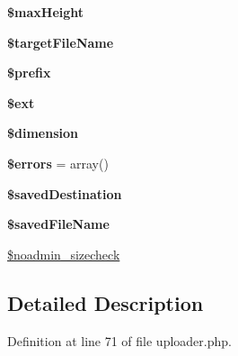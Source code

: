 \begin{DoxyCompactItemize}
\item 
\hypertarget{class_xoops_media_uploader_a51d0340c9b1667b56c371dd3b2a8e461}{{\bfseries \$max\-Height}}\label{class_xoops_media_uploader_a51d0340c9b1667b56c371dd3b2a8e461}

\item 
\hypertarget{class_xoops_media_uploader_a1d1c024dae3b732f752c751b4b34b765}{{\bfseries \$target\-File\-Name}}\label{class_xoops_media_uploader_a1d1c024dae3b732f752c751b4b34b765}

\item 
\hypertarget{class_xoops_media_uploader_a09e8cf95b9d29955a0bfabca9b420edc}{{\bfseries \$prefix}}\label{class_xoops_media_uploader_a09e8cf95b9d29955a0bfabca9b420edc}

\item 
\hypertarget{class_xoops_media_uploader_ade30ae71930839daaf6f83bd19081493}{{\bfseries \$ext}}\label{class_xoops_media_uploader_ade30ae71930839daaf6f83bd19081493}

\item 
\hypertarget{class_xoops_media_uploader_a763474b73f8036c19e7d429a99a899d6}{{\bfseries \$dimension}}\label{class_xoops_media_uploader_a763474b73f8036c19e7d429a99a899d6}

\item 
\hypertarget{class_xoops_media_uploader_ab24faf4aa647cdcee494fc48524ad4ff}{{\bfseries \$errors} = array()}\label{class_xoops_media_uploader_ab24faf4aa647cdcee494fc48524ad4ff}

\item 
\hypertarget{class_xoops_media_uploader_aef4113061d8485d20bbd51b55351b91f}{{\bfseries \$saved\-Destination}}\label{class_xoops_media_uploader_aef4113061d8485d20bbd51b55351b91f}

\item 
\hypertarget{class_xoops_media_uploader_a31bf9b236d86ec6d2af5ae7aef248747}{{\bfseries \$saved\-File\-Name}}\label{class_xoops_media_uploader_a31bf9b236d86ec6d2af5ae7aef248747}

\item 
\hyperlink{class_xoops_media_uploader_aa84937e3a0b235dafe88d4b9bbb7ebe8}{\$noadmin\-\_\-sizecheck}
\end{DoxyCompactItemize}


\subsection{Detailed Description}


Definition at line 71 of file uploader.\-php.



